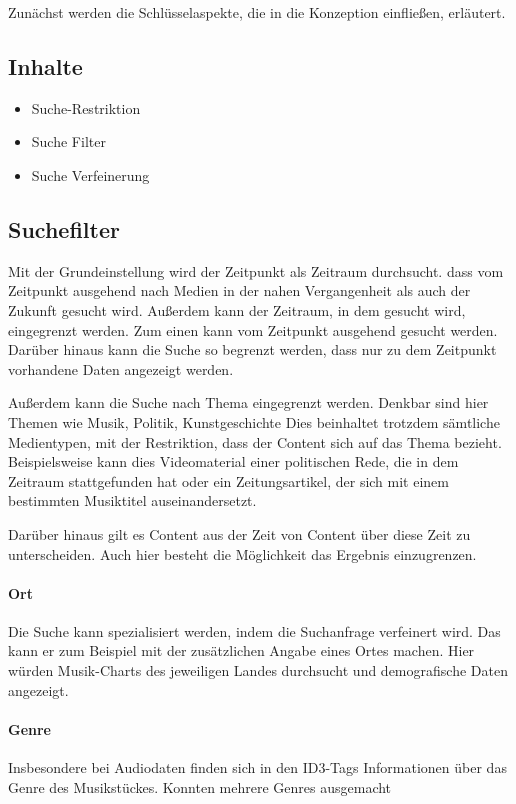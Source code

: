 Zunächst werden die Schlüsselaspekte, die in die Konzeption einfließen, erläutert.

\subsection{Inhalte}

\begin{itemize}
	\item Suche-Restriktion
	\item Suche Filter
	\item Suche Verfeinerung
\end{itemize}

\subsection{Suchefilter}
Mit der Grundeinstellung wird der Zeitpunkt als Zeitraum durchsucht. \Dahe dass vom Zeitpunkt ausgehend nach Medien in der nahen Vergangenheit als auch der Zukunft gesucht wird. Außerdem kann der Zeitraum, in dem gesucht wird, eingegrenzt werden. Zum einen kann vom Zeitpunkt ausgehend gesucht werden. Darüber hinaus kann die Suche so begrenzt werden, dass nur zu dem Zeitpunkt vorhandene Daten angezeigt werden.

Außerdem kann die Suche nach Thema eingegrenzt werden. Denkbar sind hier Themen wie Musik, Politik, Kunstgeschichte \ua Dies beinhaltet trotzdem sämtliche Medientypen, mit der Restriktion, dass der Content sich auf das Thema bezieht. Beispielsweise kann dies Videomaterial einer politischen Rede, die in dem Zeitraum stattgefunden hat oder ein Zeitungsartikel, der sich mit einem bestimmten Musiktitel auseinandersetzt.

Darüber hinaus gilt es Content aus der Zeit von Content über diese Zeit zu unterscheiden. Auch hier besteht die Möglichkeit das Ergebnis einzugrenzen.

\paragraph{Ort}
Die Suche kann spezialisiert werden, indem die Suchanfrage verfeinert wird. Das kann er zum Beispiel mit der zusätzlichen Angabe eines Ortes machen. Hier würden \zB Musik-Charts des jeweiligen Landes durchsucht und demografische Daten angezeigt.

\paragraph{Genre}
Insbesondere bei Audiodaten finden sich in den ID3-Tags Informationen über das Genre des Musikstückes. Konnten mehrere Genres ausgemacht


